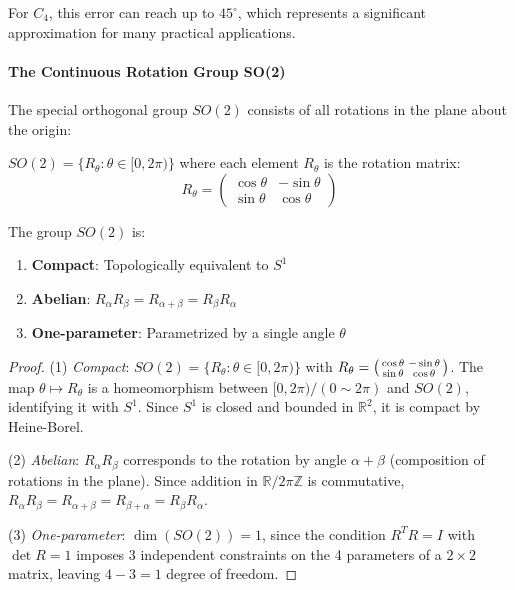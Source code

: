 For $C_4$, this error can reach up to $45^{\circ}$, which represents a significant approximation for many practical applications.

\paragraph{The Continuous Rotation Group SO(2)}

The special orthogonal group $SO(2)$ consists of all rotations in the plane about the origin:

\begin{definition}[Group SO(2)]
$SO(2) = \{R_\theta : \theta \in [0, 2\pi)\}$ where each element $R_\theta$ is the rotation matrix:
\begin{equation}
R_\theta = \begin{pmatrix}
\cos \theta & -\sin \theta \\
\sin \theta & \cos \theta
\end{pmatrix}
\end{equation}
\end{definition}

\begin{proposition}[Properties of SO(2)]
The group $SO(2)$ is:
\begin{enumerate}
    \item \textbf{Compact}: Topologically equivalent to $S^1$
    \item \textbf{Abelian}: $R_\alpha R_\beta = R_{\alpha + \beta} = R_\beta R_\alpha$
    \item \textbf{One-parameter}: Parametrized by a single angle $\theta$
\end{enumerate}
\end{proposition}

\begin{proof}
(1) \textit{Compact}: $SO(2) = \{R_\theta : \theta \in [0, 2\pi)\}$ with $R_\theta = \begin{psmallmatrix} \cos\theta & -\sin\theta \\ \sin\theta & \cos\theta \end{psmallmatrix}$. The map $\theta \mapsto R_\theta$ is a homeomorphism between $[0, 2\pi) / (0 \sim 2\pi)$ and $SO(2)$, identifying it with $S^1$. Since $S^1$ is closed and bounded in $\mathbb{R}^2$, it is compact by Heine-Borel.

(2) \textit{Abelian}: $R_\alpha R_\beta$ corresponds to the rotation by angle $\alpha + \beta$ (composition of rotations in the plane). Since addition in $\mathbb{R}/2\pi\mathbb{Z}$ is commutative, $R_\alpha R_\beta = R_{\alpha+\beta} = R_{\beta+\alpha} = R_\beta R_\alpha$.

(3) \textit{One-parameter}: $\dim(SO(2)) = 1$, since the condition $R^TR = I$ with $\det R = 1$ imposes 3 independent constraints on the 4 parameters of a $2 \times 2$ matrix, leaving $4 - 3 = 1$ degree of freedom.
\end{proof}

